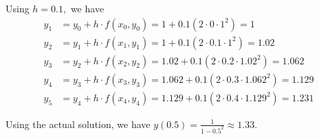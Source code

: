 \documentclass{article}
\begin{document}
\begin{enumerate}
\begin{enumerate}[(a)]
\begin{soln}
					Using $h=0.1,$ we have
					\begin{align*}
						y_1 &= y_0 + h\cdot f(x_0, y_0) = 1 + 0.1(2\cdot 0\cdot 1^2) = 1 \\
						y_2 &= y_1 + h\cdot f(x_1, y_1) = 1+0.1(2\cdot 0.1\cdot 1^2)=1.02 \\
						y_3 &= y_2 + h\cdot f(x_2, y_2) = 1.02 + 0.1(2\cdot 0.2\cdot 1.02^2) = 1.062 \\
						y_4 &= y_3 + h\cdot f(x_3, y_3) = 1.062 + 0.1(2\cdot 0.3\cdot 1.062^2) = 1.129 \\
						y_5 &= y_4 + h\cdot f(x_4, y_4) = 1.129 + 0.1(2\cdot 0.4\cdot 1.129^2) = 1.231
					\end{align*}

					Using the actual solution, we have $y(0.5)=\frac{1}{1-0.5^2} \approx 1.33.$
				\end{soln}


\end{enumerate}
\end{enumerate}
\end{document}
